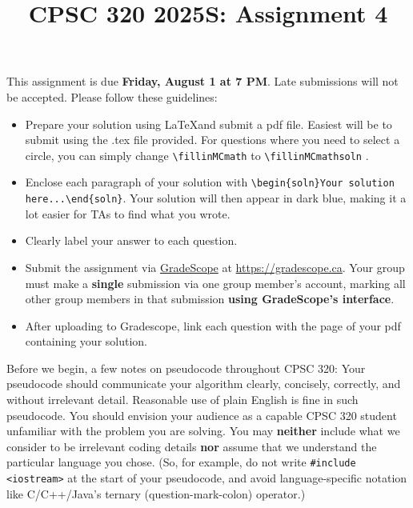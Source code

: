 \documentclass[11pt,fleqn]{exam}
\author{}
\date{}
\title{CPSC 320 2025S: Assignment 4}
\newcommand{\fillinMCmath}[1]{\begin{tikzpicture}\draw circle [radius=0.5em];\end{tikzpicture}\ #1}
\newcommand{\fillinMCmathsoln}[1]{\begin{tikzpicture}\draw[black, fill=blue] circle [radius=0.5em];\end{tikzpicture}\ #1}
\newenvironment{soln}{\color{solnblue}}{}
\begin{document}
	
	\maketitle
	\vspace{-0.5in} This assignment is due \textbf{Friday, August 1 at 7 PM}. Late submissions will not be accepted. Please follow these guidelines:
	\begin{itemize}
		\item Prepare your  solution using \LaTeX and submit  a pdf file. Easiest will be to submit using
		the .tex file provided. For questions where you  need to select a circle, you can simply
		change \verb~\fillinMCmath~ to \verb~\fillinMCmathsoln~ .
		
		\item Enclose each paragraph of your solution with
		\verb~\begin{soln}Your solution here...\end{soln}~.
		\begin{soln}Your  solution will  then appear  in dark  blue\end{soln}, making  it a  lot
		easier for TAs to find what you wrote.
		
		\item Clearly label your answer to each question.
		
		\item   Submit   the    assignment   via   \href{https://gradescope.ca/}{GradeScope}   at
		\url{https://gradescope.ca}. Your group must make  a \textbf{single} submission via one
		group member's account, marking all other group members in that submission \textbf{using
			GradeScope's interface}.
		
		\item  After uploading  to  Gradescope, link  each  question  with the  page  of your  pdf
		containing your solution.
	\end{itemize}
	
	Before we  begin, a few  notes on pseudocode throughout  CPSC 320: Your  pseudocode should
	communicate your algorithm  clearly, concisely, correctly, and  without irrelevant detail.
	Reasonable use  of plain  English is  fine in  such pseudocode.  You should  envision your
	audience as a capable CPSC 320 student unfamiliar with the problem you are solving. You may \textbf{neither} include what we consider to be irrelevant coding details \textbf{nor} assume that  we understand the particular  language you
	chose. (So, for example,  do not write \texttt{\#include <iostream>} at  the start of your
	pseudocode,   and    avoid   language-specific   notation   like    C/C++/Java's   ternary
	(question-mark-colon) operator.)
	
\end{document}
